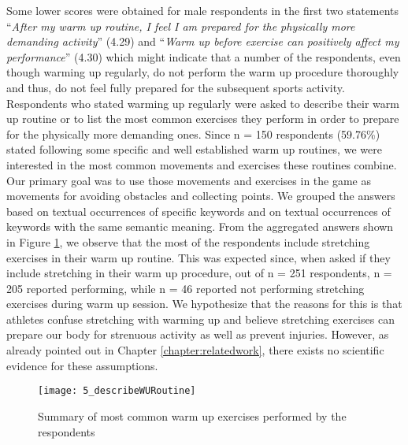 Some lower scores were obtained for male respondents in the first two statements ``\textit{After my warm up routine, I feel I am prepared for the physically more demanding activity}'' (4.29) and ``\textit{Warm up before exercise can positively affect my performance}'' (4.30) which might indicate that a number of the respondents, even though warming up regularly, do not perform the warm up procedure thoroughly and thus, do not feel fully prepared for the subsequent sports activity.\\ Respondents who stated warming up regularly were asked to describe their warm up routine or to list the most common exercises they perform in order to prepare for the physically more demanding ones. Since  n = 150 respondents (59.76\%) stated following some specific and well established warm up routines, we were interested in the most common movements and exercises these routines combine. Our primary goal was to use those movements and exercises in the game as movements for avoiding obstacles and collecting points. We grouped the answers based on textual occurrences of specific keywords and on textual occurrences of keywords with the same semantic meaning. From the aggregated answers  shown in Figure \ref{fig:5_describeWURoutine}, we observe that the most of the respondents include stretching exercises in their warm up routine. This was expected since, when asked if they include stretching in their warm up procedure, out of n = 251 respondents, n = 205 reported performing, while n = 46 reported not performing stretching exercises during warm up session. We hypothesize that the reasons for this is that athletes confuse stretching with warming up and believe stretching exercises can prepare our body for strenuous activity as well as prevent injuries. However, as already pointed out in Chapter \ref{chapter:relatedwork}, there exists no scientific evidence for these assumptions. \\
\begin{figure}[h]
    \centering
    \texttt{[image: 5\_describeWURoutine]}
    \caption{Summary of most common warm up exercises performed by the respondents}
    \label{fig:5_describeWURoutine}
\end{figure}\\

